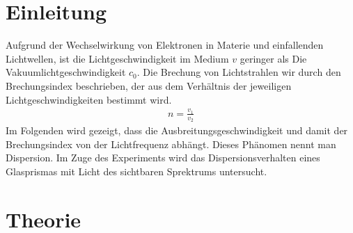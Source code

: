 
\section{Einleitung}				%
\setcounter{page}{1}
Aufgrund der Wechselwirkung von Elektronen in Materie und einfallenden Lichtwellen, ist die Lichtgeschwindigkeit im Medium $v$ geringer als
Die Vakuumlichtgeschwindigkeit $c_0$. Die Brechung von Lichtstrahlen wir durch den Brechungsindex beschrieben, der aus dem Verhältnis der
jeweiligen Lichtgeschwindigkeiten bestimmt wird.
\begin{align}
 n = \frac{v_1}{v_2}
\end{align}
Im Folgenden wird gezeigt, dass die Ausbreitungsgeschwindigkeit und damit der Brechungsindex von der Lichtfrequenz abhängt. Dieses Phänomen
nennt man Dispersion. Im Zuge des Experiments wird das Dispersionsverhalten eines Glasprismas mit Licht des sichtbaren Sprektrums untersucht.
\section{Theorie}
